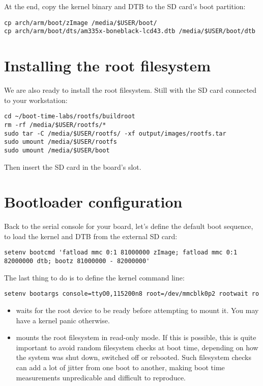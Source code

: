 At the end, copy the kernel binary and DTB to the SD card's boot
partition:

\begin{verbatim}
cp arch/arm/boot/zImage /media/$USER/boot/
cp arch/arm/boot/dts/am335x-boneblack-lcd43.dtb /media/$USER/boot/dtb
\end{verbatim}

\section{Installing the root filesystem}

We are also ready to install the root filesystem. Still with the SD card
connected to your workstation:

\begin{verbatim}
cd ~/boot-time-labs/rootfs/buildroot
rm -rf /media/$USER/rootfs/*
sudo tar -C /media/$USER/rootfs/ -xf output/images/rootfs.tar
sudo umount /media/$USER/rootfs
sudo umount /media/$USER/boot
\end{verbatim}

Then insert the SD card in the board's slot.

\section{Bootloader configuration}

Back to the serial console for your board, let's define the default boot
sequence, to load the kernel and DTB from the external SD card:

{\footnotesize
\begin{verbatim}
setenv bootcmd 'fatload mmc 0:1 81000000 zImage; fatload mmc 0:1 82000000 dtb; bootz 81000000 - 82000000'
\end{verbatim}
}

{\footnotesize
The last thing to do is to define the kernel command line:
\begin{verbatim}
setenv bootargs console=ttyO0,115200n8 root=/dev/mmcblk0p2 rootwait ro
\end{verbatim}
}

\begin{itemize}
\item {} waits for the root device to be ready before
attempting to mount it. You may have a kernel panic otherwise.
\item {} mounts the root filesystem in read-only mode.
If this is possible, this is quite important to avoid random
filesystem checks at boot time, depending on how the system was shut
down, switched off or rebooted. Such filesystem checks can add a lot
of jitter from one boot to another, making boot time measurements
unpredicable and difficult to reproduce.
\end{itemize}

